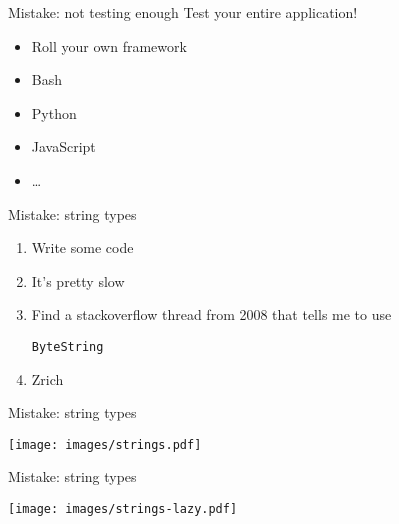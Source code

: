 \documentclass[20pt]{beamer}
\newcommand{\vspaced}{
    \vspace{5mm}
}
\newcommand{\code}[1]{
    \texttt{\small{#1}}
}
\begin{document}
\begin{frame}{Mistake: not testing enough}
    Test your entire application! \\
    \vspaced
    \begin{itemize}
    \item Roll your own framework
    \item Bash
    \item Python
    \item JavaScript
    \item \ldots
    \end{itemize}
\end{frame}


\begin{frame}{Mistake: string types}
    \begin{enumerate}
    \item Write some code
    \item It's pretty slow
    \item Find a stackoverflow thread from 2008 that tells me to use
        \code{ByteString}
    \item Zrich
    \end{enumerate}
\end{frame}

\begin{frame}{Mistake: string types}
    \begin{center}
    \texttt{[image: images/strings.pdf]}
    \end{center}
\end{frame}

\begin{frame}{Mistake: string types}
    \begin{center}
    \texttt{[image: images/strings-lazy.pdf]}
    \end{center}
\end{frame}
\end{document}
